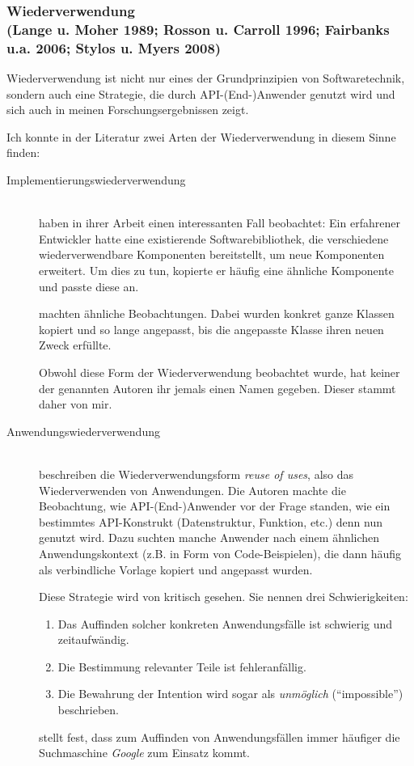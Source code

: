 \subsubsection{Wiederverwendung\\(Lange u. Moher 1989; Rosson u. Carroll 1996; Fairbanks u.a. 2006; Stylos u. Myers 2008)}
\begin{important}
Wiederverwendung ist nicht nur eines der Grundprinzipien von Softwaretechnik, sondern auch eine Strategie, die durch API-(End-)Anwender genutzt wird und sich auch in meinen Forschungsergebnissen zeigt.

Ich konnte in der Literatur zwei Arten der Wiederverwendung in diesem Sinne finden:

\begin{description}
  \item[Implementierungswiederverwendung] \hfill \\
  \cite{Lange:1989jr} haben in ihrer Arbeit einen interessanten Fall beobachtet: Ein erfahrener Entwickler hatte eine existierende Softwarebibliothek, die verschiedene wiederverwendbare Komponenten bereitstellt, um neue Komponenten erweitert. Um dies zu tun, kopierte er häufig eine ähnliche Komponente und passte diese an.
  
  \cite{Rosson:1996da,Stylos:2008jt} machten ähnliche Beobachtungen. Dabei wurden konkret ganze Klassen kopiert und so lange angepasst, bis die angepasste Klasse ihren neuen Zweck erfüllte.
  
  Obwohl diese Form der Wiederverwendung beobachtet wurde, hat keiner der genannten Autoren ihr jemals einen Namen gegeben. Dieser stammt daher von mir.
  
  \item[Anwendungswiederverwendung]\label{sec:reuse-of-uses} \hfill \\
  \cite{Rosson:1996da} beschreiben die Wiederverwendungsform \textit{reuse of uses}, also das Wiederverwenden von Anwendungen. Die Autoren machte die Beobachtung, wie API-(End-)Anwender vor der Frage standen, wie ein bestimmtes API-Konstrukt (Datenstruktur, Funktion, etc.) denn nun genutzt wird. Dazu suchten manche Anwender nach einem ähnlichen Anwendungskontext (z.B. in Form von Code-Beispielen), die dann häufig als verbindliche Vorlage kopiert und angepasst wurden.
  
  Diese Strategie wird von \cite{Fairbanks:2006jw} kritisch gesehen. Sie nennen drei Schwierigkeiten:
  \begin{enumerate}
    \item Das Auffinden solcher konkreten Anwendungsfälle ist schwierig und zeitaufwändig.
    \item Die Bestimmung relevanter Teile ist fehleranfällig.
    \item Die Bewahrung der Intention wird sogar als \textit{unmöglich} (``impossible'') beschrieben.
  \end{enumerate}
  
  \cite{Stylos:2009ts} stellt fest, dass zum Auffinden von Anwendungsfällen immer häufiger die Suchmaschine \textit{Google} zum Einsatz kommt.
\end{description}
\end{important}


